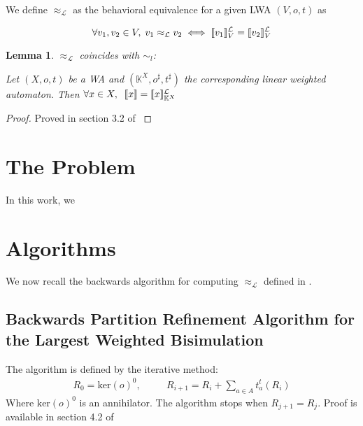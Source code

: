\documentclass{article}
\theoremstyle{plain}%
\newtheorem{lem}[thm]{Lemma}
\theoremstyle{definition}
\theoremstyle{remark}
\def\K{\mathbb{K}}
\DeclarePairedDelimiter\sqmap{\llbracket}{\rrbracket}
\newcommand{\mker}[1]{\text{ker}\left(#1\right)}
\newcommand{\llwb}{\approx_{\mathcal{L}}}
\newcommand{\langlwa}[2]{\sqmap{#1}^\mathcal{L}_{#2}}
\begin{document}
We define $\llwb$ as the behavioral equivalence for a given LWA $(V, o, t)$ as 

\begin{equation}
  \forall v_1, v_2 \in V, \; v_1 \llwb v_2 \iff \langlwa{v_1}{V} = \langlwa{v_2}{V}
\end{equation}


\begin{lem}
  $\llwb$ coincides with $\sim_l$: 

  Let $(X, o, t)$ be a WA and $(\K^X, o^\sharp, t^\sharp)$ the corresponding linear 
  weighted automaton. Then $\forall x \in X, \;\; \sqmap{x} = \langlwa{x}{\K^X}$
\end{lem}

\begin{proof}
  Proved in section 3.2 of \cite{BONCHI201277}
\end{proof}







\section{The Problem}
In this work, we  


\section{Algorithms}

We now recall the backwards algorithm for computing $\llwb$ defined in \cite{BONCHI201277}.

\subsection{Backwards Partition Refinement Algorithm for the Largest Weighted Bisimulation}
\label{sec:algo2}

The algorithm is defined by the iterative method:
\begin{eqnarray}
  R_0 = \mker{o}^0, & \quad & R_{i+1} = R_i + \sum_{a \in A} t_a^t(R_i) \label{back} 
\end{eqnarray}
Where $\mker{o}^0$ is an annihilator.
The algorithm stops when $R_{j+1} = R_j$. Proof is available in section 4.2 of \cite{BONCHI201277}



%
\end{document}
